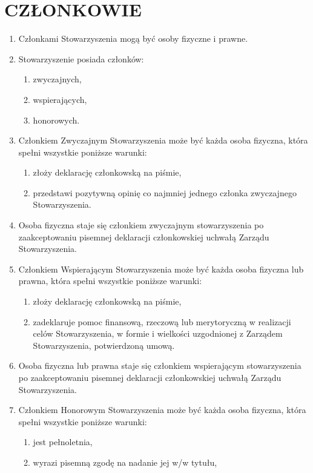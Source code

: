 \documentclass{article}
\begin{document}
\section{CZŁONKOWIE}
  \begin{enumerate}
    \item Członkami Stowarzyszenia mogą być osoby fizyczne i prawne.
    \item Stowarzyszenie posiada członków:
      \begin{enumerate}
        \item zwyczajnych,
        \item wspierających,
        \item honorowych.
      \end{enumerate}
    \item Członkiem Zwyczajnym Stowarzyszenia może być każda osoba fizyczna, która spełni wszystkie poniższe warunki:
      \begin{enumerate}
        \item złoży deklarację członkowską na piśmie,
        \item przedstawi pozytywną opinię co najmniej jednego członka zwyczajnego Stowarzyszenia.
      \end{enumerate}
    \item Osoba fizyczna staje się członkiem zwyczajnym stowarzyszenia po zaakceptowaniu pisemnej deklaracji członkowskiej uchwałą Zarządu Stowarzyszenia.
    \item Członkiem Wspierającym Stowarzyszenia może być każda osoba fizyczna lub prawna, która spełni wszystkie poniższe warunki:
      \begin{enumerate}
        \item złoży deklarację członkowską na piśmie,
        \item zadeklaruje pomoc finansową, rzeczową lub merytoryczną w realizacji celów Stowarzyszenia, w formie i wielkości uzgodnionej z Zarządem Stowarzyszenia, potwierdzoną umową.
      \end{enumerate}
    \item Osoba fizyczna lub prawna staje się członkiem wspierającym stowarzyszenia po zaakceptowaniu pisemnej deklaracji członkowskiej uchwałą Zarządu Stowarzyszenia.
    \item Członkiem Honorowym Stowarzyszenia może być każda osoba fizyczna, która spełni wszystkie poniższe warunki:
      \begin{enumerate}
        \item jest pełnoletnia,
        \item wyrazi pisemną zgodę na nadanie jej w/w tytułu,

\end{enumerate}
\end{enumerate}
\end{document}
